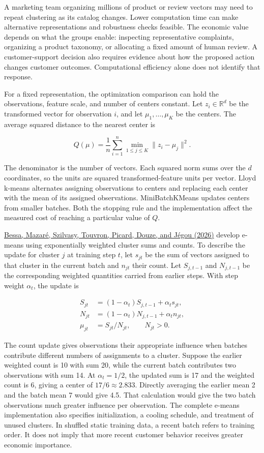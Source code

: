 \noindent \noindent A marketing team organizing millions of product or review
vectors may need to repeat clustering as its catalog changes. Lower
computation time can make alternative representations and robustness
checks feasible. The economic value depends on what the groups enable:
inspecting representative complaints, organizing a product taxonomy, or
allocating a fixed amount of human review. A customer-support decision
also requires evidence about how the proposed action changes customer
outcomes. Computational efficiency alone does not identify that
response.

For a fixed representation, the optimization comparison can hold the
observations, feature scale, and number of centers constant. Let
\(z_i\in\mathbb{R}^d\) be the transformed vector for observation \(i\),
and let \(\mu_1,\ldots,\mu_K\) be the centers. The average squared
distance to the nearest center is

\[
Q(\mu)=\frac{1}{n}\sum_{i=1}^{n}\min_{1\leq j\leq K}\|z_i-\mu_j\|^2.
\]

The denominator is the number of vectors. Each squared norm sums over
the \(d\) coordinates, so the units are squared transformed-feature
units per vector. Lloyd k-means alternates assigning observations to
centers and replacing each center with the mean of its assigned
observations. MiniBatchKMeans updates centers from smaller batches. Both
the stopping rule and the implementation affect the measured cost of
reaching a particular value of \(Q\).

\href{https://arxiv.org/abs/2611.09501v1}{Bessa, Mazaré, Szilvasy,
Touvron, Picard, Douze, and Jégou (2026)} develop e-means using
exponentially weighted cluster sums and counts. To describe the update
for cluster \(j\) at training step \(t\), let \(s_{jt}\) be the sum of
vectors assigned to that cluster in the current batch and \(n_{jt}\)
their count. Let \(S_{j,t-1}\) and \(N_{j,t-1}\) be the corresponding
weighted quantities carried from earlier steps. With step weight
\(\alpha_t\), the update is

\[
\begin{aligned}
S_{jt}&=(1-\alpha_t)S_{j,t-1}+\alpha_t s_{jt},\\
N_{jt}&=(1-\alpha_t)N_{j,t-1}+\alpha_t n_{jt},\\
\mu_{jt}&=S_{jt}/N_{jt},\qquad N_{jt}>0.
\end{aligned}
\]

The count update gives observations their appropriate influence when
batches contribute different numbers of assignments to a cluster.
Suppose the earlier weighted count is 10 with sum 20, while the current
batch contributes two observations with sum 14. At \(\alpha_t=1/2\), the
updated sum is 17 and the weighted count is 6, giving a center of
\(17/6\approx2.833\). Directly averaging the earlier mean 2 and the
batch mean 7 would give 4.5. That calculation would give the two batch
observations much greater influence per observation. The complete
e-means implementation also specifies initialization, a cooling
schedule, and treatment of unused clusters. In shuffled static training
data, a recent batch refers to training order. It does not imply that
more recent customer behavior receives greater economic importance.

